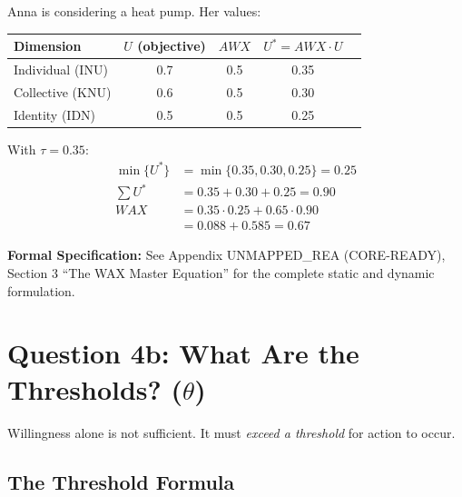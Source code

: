\begin{example}
Anna is considering a heat pump. Her values:

\begin{center}
\begin{tabular}{lcccc}
\toprule
\textbf{Dimension} & $U$ (objective) & $AWX$ & $U^* = AWX \cdot U$ \\
\midrule
Individual (INU) & 0.7 & 0.5 & 0.35 \\
Collective (KNU) & 0.6 & 0.5 & 0.30 \\
Identity (IDN) & 0.5 & 0.5 & 0.25 \\
\bottomrule
\end{tabular}
\end{center}

With $\tau = 0.35$:
\begin{align}
\min\{U^*\} &= \min\{0.35, 0.30, 0.25\} = 0.25\\
\sum U^* &= 0.35 + 0.30 + 0.25 = 0.90\\
WAX &= 0.35 \cdot 0.25 + 0.65 \cdot 0.90\\
&= 0.088 + 0.585 = \mathbf{0.67}
\end{align}
\end{example}

\begin{cross-reference}
\textbf{Formal Specification:} See Appendix UNMAPPED_REA (CORE-READY), Section 3 ``The WAX Master
Equation'' for the complete static and dynamic formulation.
\end{cross-reference}



\section{Question 4b: What Are the Thresholds? ($\theta$)}
\label{sec:12-theta}


Willingness alone is not sufficient. It must \textit{exceed a threshold} for
action to occur.

\subsection{The Threshold Formula}

